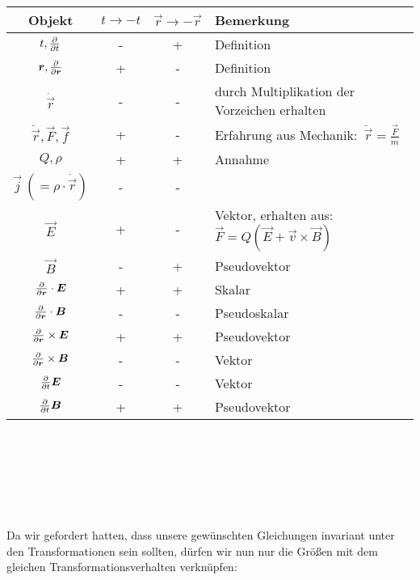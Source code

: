 \begin{tabular}{c|c|c|l}
	Objekt & $t\rightarrow-t$ & $\vec{r}\rightarrow-\vec{r}$ & Bemerkung\\
	\hline $t, \frac{\partial{}}{\partial{t}}$ & - & + & Definition\\
	$\bm{r},\frac{\partial{}}{\partial{\bm{r}}}$ & + & -& Definition\\
	$\dot{\vec{r}}$ & -& - & durch Multiplikation der Vorzeichen erhalten\\
	$\ddot{\vec{r}},\vec{F},\vec{f}$ & + & - & Erfahrung aus Mechanik:\ $\ddot{\vec{r}}=\frac{\vec{F}}{m}$\\
	$Q,\rho$ & + & + & Annahme\\
	$\vec{j}\ (=\rho\cdot\dot{\vec{r}})$ & - & - & \\
	$\vec{E}$ & + & - & Vektor, erhalten aus: $\vec{F}=Q(\vec{E}+\vec{v}\times\vec{B})$\\
	$\vec{B}$ & - & + & Pseudovektor\\
	$\frac{\partial{}}{\partial{\bm{r}}}\cdot\bm{E}$ & + & + & Skalar\\
	$\frac{\partial{}}{\partial{\bm{r}}}\cdot\bm{B}$ & - & - & Pseudoskalar\\
	$\frac{\partial{}}{\partial{\bm{r}}}\times\bm{E}$ & + & + & Pseudovektor\\
	$\frac{\partial{}}{\partial{\bm{r}}}\times\bm{B}$ & - & - & Vektor\\
	$\frac{\partial{}}{\partial{t}}\bm{E}$ & - & - & Vektor\\
	$\frac{\partial{}}{\partial{t}}\bm{B}$ & + & + & Pseudovektor
\end{tabular}
\ \\
\ \\
\ \\
\ \\
\ \\
\ \\
Da wir gefordert hatten, dass unsere gewünschten Gleichungen invariant unter den Transformationen sein sollten, dürfen wir nun nur die Größen mit dem gleichen Transformationsverhalten verknüpfen:\ \\


